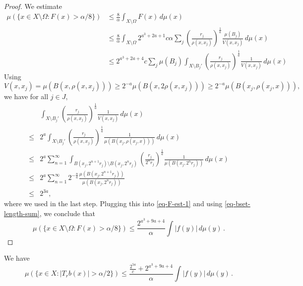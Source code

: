 \begin{proof}
    We estimate
    \begin{align}
        \mu(\{x\in X\setminus\Omega: F(x)> \alpha/8\})
        &\le \frac{8}{\alpha} \int_{X\setminus \Omega} F(x)\,d\mu(x) \\
        &\le \frac{8}{\alpha} \int_{X\setminus \Omega} 2^{a^3+2a+1} c\alpha \sum_{j} \left(\frac{r_j}{\rho(x,x_j)}\right)^{\frac{1}{a}}\frac{\mu(B_j)}{V(x,x_j)}\,d\mu(x) \\
        \label{eq-F-est-1}
        &\le 2^{a^3+2a+4} c \sum_{j} \mu(B_j) \int_{X\setminus B_j'} \left(\frac{r_j}{\rho(x,x_j)}\right)^{\frac{1}{a}}\frac{1}{V(x,x_j)}\,d\mu(x)
    \end{align}
    Using
    \begin{equation*}
        V(x,x_j) = \mu(B(x,\rho(x,x_j))) \ge 2^{-a}\mu(B(x,2\rho(x,x_j))) \ge 2^{-a} \mu(B(x_j,\rho(x_j,x))),
    \end{equation*}
    we have for all $j\in J$,
    \begin{align*}
        &\int_{X\setminus B_j'} \left(\frac{r_j}{\rho(x,x_j)}\right)^{\frac{1}{a}}\frac{1}{V(x,x_j)}\,d\mu(x) \\
        \le& 2^a \int_{X\setminus B_j'} \left(\frac{r_j}{\rho(x,x_j)}\right)^{\frac{1}{a}}\frac{1}{\mu(B(x_j,\rho(x_j,x)))}\,d\mu(x) \\
        \le&2^a \sum_{n=1}^\infty \int_{B(x_j,2^{n+1}r_j)\setminus B(x_j,2^n r_j)} \left(\frac{r_j}{2^n r_j}\right)^{\frac{1}{a}}\frac{1}{\mu(B(x_j,2^n r_j))}\,d\mu(x) \\
        \le&2^a \sum_{n=1}^\infty 2^{-\frac{n}{a}} \frac{\mu(B(x_j,2^{n+1}r_j))}{\mu(B(x_j,2^n r_j))} \\
        \le&2^{3a},
    \end{align*}
    where we used  in the last step.
    Plugging this into \eqref{eq-F-est-1} and using \eqref{eq-bset-length-sum}, we conclude that
    \begin{equation*}
        \mu(\{x\in X\setminus\Omega: F(x)> \alpha/8\}) \le \frac{2^{a^3+9a+4}}{\alpha} \int |f(y)|\,d\mu(y)\,.
    \end{equation*}
\end{proof}


\begin{lemma}
    \label{estimate-bad}
    We have
    \begin{equation*}
        \mu\left({\{x\in X: |T_r b(x)|>\alpha/2\}}\right) \le  \frac{\frac{2^{5a}}{c} + 2^{a^3+9a+4}}{\alpha} \int |f(y)|\,d\mu(y) \,.
    \end{equation*}
\end{lemma}

